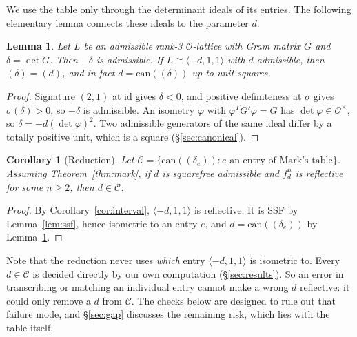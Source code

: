 \documentclass[11pt]{amsart}
\newtheorem{lemma}[theorem]{Lemma}
\newtheorem{corollary}[theorem]{Corollary}
\theoremstyle{definition}
\newcommand{\OK}{\mathcal{O}}
\newcommand{\id}{\mathrm{id}}
\begin{document}
We use the table only through the determinant ideals of its entries. The following elementary
lemma connects these ideals to the parameter $d$.

\begin{lemma}\label{lem:det}
Let $L$ be an admissible rank-3 $\OK$-lattice with Gram matrix $G$ and $\delta=\det G$. Then
$-\delta$ is admissible. If $L\cong\langle-d,1,1\rangle$ with $d$ admissible, then
$(\delta)=(d)$, and in fact $d=\mathrm{can}((\delta))$ up to unit squares.
\end{lemma}
\begin{proof}
Signature $(2,1)$ at $\id$ gives $\delta<0$, and positive definiteness at $\sigma$ gives
$\sigma(\delta)>0$, so $-\delta$ is admissible. An isometry $\varphi$ with
$\varphi^{T}G'\varphi=G$ has $\det\varphi\in\OK^\times$, so $\delta=-d(\det\varphi)^2$. Two
admissible generators of the same ideal differ by a totally positive unit, which is a square
(\S\ref{sec:canonical}).
\end{proof}

\begin{corollary}[Reduction]\label{cor:reduction}
Let $\mathcal C=\{\mathrm{can}((\delta_e)) : e \text{ an entry of Mark's table}\}$. Assuming
Theorem~\ref{thm:mark}, if $d$ is squarefree admissible and $f_d^n$ is reflective for some
$n\ge2$, then $d\in\mathcal C$.
\end{corollary}
\begin{proof}
By Corollary~\ref{cor:interval}, $\langle-d,1,1\rangle$ is reflective. It is SSF by
Lemma~\ref{lem:ssf}, hence isometric to an entry $e$, and $d=\mathrm{can}((\delta_e))$ by
Lemma~\ref{lem:det}.
\end{proof}

Note that the reduction never uses \emph{which} entry $\langle-d,1,1\rangle$ is isometric
to. Every $d\in\mathcal C$ is decided directly by our own computation (\S\ref{sec:results}).
So an error in transcribing or matching an individual entry cannot make a wrong $d$
reflective: it could only remove a $d$ from $\mathcal C$. The checks below are designed to
rule out that failure mode, and \S\ref{sec:gap} discusses the remaining risk, which lies with
the table itself.
\end{document}
